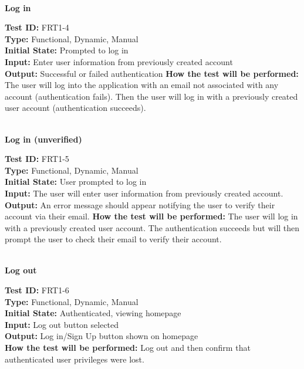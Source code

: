 \documentclass[12pt,fleqn]{article}
\begin{document}
\newpage



\textbf{\\Log in}
\begin{tcolorbox}
\textbf{Test ID:} FRT1-4\\
\textbf{Type:} Functional, Dynamic, Manual\\
\textbf{Initial State:} Prompted to log in\\
\textbf{Input:} Enter user information from previously created account\\
\textbf{Output:} Successful or failed authentication
\textbf{How the test will be performed:} The user will log into the application with an email not associated with any account (authentication fails). Then the user will log in with a previously created user account (authentication succeeds).
\end{tcolorbox}

\textbf{\\Log in (unverified)}
\begin{tcolorbox}
\textbf{Test ID:} FRT1-5\\
\textbf{Type:} Functional, Dynamic, Manual\\
\textbf{Initial State:} User prompted to log in\\
\textbf{Input:} The user will enter user information from previously created account.\\
\textbf{Output:} An error message should appear notifying the user to verify their account via their email.
\textbf{How the test will be performed:} The user will log in with a previously created user account. The authentication succeeds but will then prompt the user to check their email to verify their account. 
\end{tcolorbox}

\textbf{\\Log out}
\begin{tcolorbox}
\textbf{Test ID:} FRT1-6\\
\textbf{Type:} Functional, Dynamic, Manual\\
\textbf{Initial State:} Authenticated, viewing homepage\\
\textbf{Input:} Log out button selected\\
\textbf{Output:} Log in/Sign Up button shown on homepage\\
\textbf{How the test will be performed:} Log out and then confirm that authenticated user privileges were lost.
\end{tcolorbox}
\end{document}
